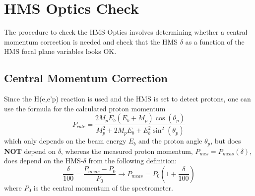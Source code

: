 \documentclass[11pt]{article}
\begin{document}
\section{HMS Optics Check} \label{sec:hms_optics_sec}
\noindent The procedure to check the HMS Optics involves determining whether a central momentum correction is needed and check that the
HMS $\delta$ as a function of the HMS focal plane variables looks OK.

\subsection{Central Momentum Correction}
Since the H(e,e'p) reaction is used and the HMS is set to detect protons, one can use the formula for the calculated proton momentum
\begin{equation}
  P_{calc} = \frac{2M_{p}E_{b}(E_{b}+M_{p})\cos(\theta_{p})}{M^{2}_{p} + 2M_{p}E_{b} + E^{2}_{b}\sin^{2}(\theta_{p})}
  \label{eq:1}
\end{equation}
which only depends on the beam energy $E_{b}$ and the proton angle $\theta_{p}$, but does \textbf{NOT} depend on $\delta$,
whereas the measured proton momentum, $P_{mes} = P_{meas}(\delta)$, does depend on the HMS-$\delta$ from the following definition:
\begin{equation}
  \frac{\delta}{100} = \frac{P_{meas} - P_{0}}{P_{0}} \rightarrow \boxed{P_{meas} = P_{0}(1 + \frac{\delta}{100})}
  \label{eq:2}
\end{equation}
where $P_{0}$ is the central momentum of the spectrometer.
\end{document}
